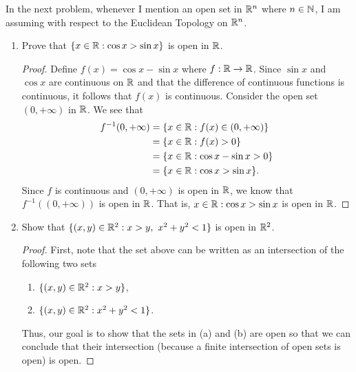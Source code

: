 \documentclass[a4paper]{article}
\begin{document}
\begin{remark}
   In the next problem, whenever I mention an open set in \( \mathbb{R}^{n}  \) where \( n \in \mathbb{N} \), I am assuming with respect to the Euclidean Topology on \( \mathbb{R}^{n} \). 
\end{remark}

\begin{problem}
   \begin{enumerate}
       \item[(i)] Prove that \( \{ x \in \mathbb{R} : \cos x > \sin x  \}   \) is open in \( \mathbb{R} \).
           \begin{proof}
           Define \( f(x) = \cos  x - \sin x  \) where \( f: \mathbb{R} \to \mathbb{R} \). Since \( \sin x  \) and \( \cos x  \) are continuous on \( \mathbb{R} \) and that the difference of continuous functions is continuous, it follows that \( f(x) \) is continuous. Consider the open set \( (0,+\infty ) \) in \( \mathbb{R}  \). We see that 
           \begin{align*}
               f^{-1}(0, +\infty ) &= \{ x \in \mathbb{R} : f(x) \in (0, +\infty ) \}  \\
                                   &= \{ x \in \mathbb{R} : f(x) > 0  \}  \\
                                   &= \{ x \in \mathbb{R} : \cos x - \sin x > 0  \} \\
                                   &= \{ x \in \mathbb{R} : \cos x > \sin x  \}.
           \end{align*}
           Since \( f \) is continuous and \( (0,+\infty ) \) is open in \( \mathbb{R} \), we know that \( f^{-1}((0,+\infty )) \) is open in \( \mathbb{R} \). That is, \( x  \in \mathbb{R} : \cos x > \sin x \) is open in \( \mathbb{R} \).
           \end{proof}
        \item[(ii)] Show that \( \{ (x,y) \in \mathbb{R}^{2} : x > y , \ x^{2} + y^{2} < 1  \}  \) is open in \( \mathbb{R}^{2} \).
            \begin{proof}
                First, note that the set above can be written as an intersection of the following two sets
                \begin{enumerate}
                    \item[(a)] \( \{ (x,y) \in \mathbb{R}^{2} : x > y \}  \),
                    \item[(b)] \( \{ (x,y) \in \mathbb{R}^{2} : x^{2} + y^{2} < 1  \}  \).
                \end{enumerate}
                Thus, our goal is to show that the sets in (a) and (b) are open so that we can conclude that their intersection (because a finite intersection of open sets is open) is open.


\end{proof}
\end{enumerate}
\end{problem}
\end{document}
